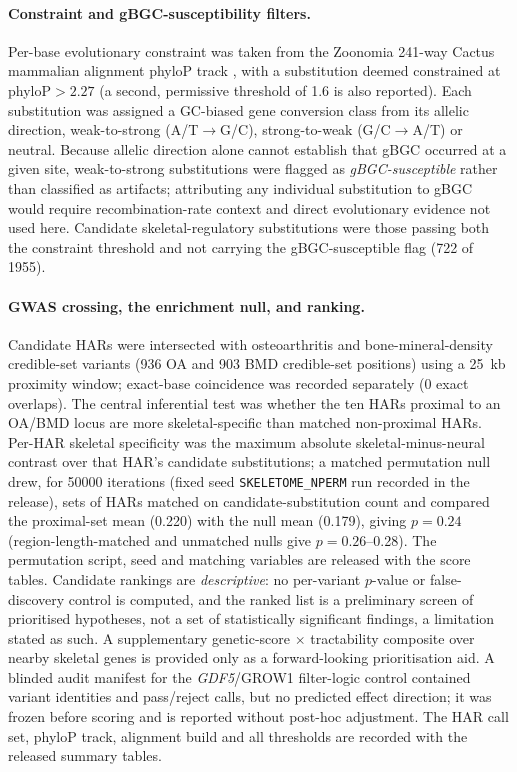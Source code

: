 \documentclass[11pt]{article}
\begin{document}
\paragraph{Constraint and gBGC-susceptibility filters.}
Per-base evolutionary constraint was taken from the Zoonomia \num{241}-way Cactus mammalian alignment
phyloP track \citep{christmas2023zoonomia}, with a substitution deemed constrained at
phyloP${}>\num{2.27}$ (a second, permissive threshold of \num{1.6} is also reported). Each
substitution was assigned a GC-biased gene conversion class \citep{duret2009gbgc} from its allelic
direction, weak-to-strong (A/T${}\rightarrow{}$G/C), strong-to-weak (G/C${}\rightarrow{}$A/T) or
neutral. Because allelic direction alone cannot establish that gBGC occurred at a given site,
weak-to-strong substitutions were flagged as \emph{gBGC-susceptible} rather than classified as
artifacts; attributing any individual substitution to gBGC would require recombination-rate context
and direct evolutionary evidence not used here. Candidate skeletal-regulatory substitutions were
those passing both the constraint threshold and not carrying the gBGC-susceptible flag
(\num{722} of \num{1955}).

\paragraph{GWAS crossing, the enrichment null, and ranking.}
Candidate HARs were intersected with osteoarthritis and bone-mineral-density credible-set variants
(\num{936} OA and \num{903} BMD credible-set positions) using a \num{25}~kb proximity window;
exact-base coincidence was recorded separately (\num{0} exact overlaps). The central inferential
test was whether the ten HARs proximal to an OA/BMD locus are more skeletal-specific than matched
non-proximal HARs. Per-HAR skeletal specificity was the maximum absolute skeletal-minus-neural
contrast over that HAR's candidate substitutions; a matched permutation null drew, for \num{50000}
iterations (fixed seed \texttt{SKELETOME\_NPERM} run recorded in the release), sets of HARs matched
on candidate-substitution count and compared the proximal-set mean (\num{0.220}) with the null mean
(\num{0.179}), giving $p=\num{0.24}$ (region-length-matched and unmatched nulls give
$p=\num{0.26}$--\num{0.28}). The permutation script, seed and matching variables are released with
the score tables. Candidate rankings are \emph{descriptive}: no per-variant $p$-value or
false-discovery control is computed, and the ranked list is a preliminary screen of prioritised
hypotheses, not a set of statistically significant findings, a limitation stated as such. A
supplementary genetic-score $\times$ tractability composite over nearby skeletal genes is provided
only as a forward-looking prioritisation aid. A blinded audit manifest for the
\textit{GDF5}/GROW1 filter-logic control contained variant identities and pass/reject calls,
but no predicted effect direction; it was frozen before scoring and is reported without
post-hoc adjustment. The HAR call set, phyloP track, alignment
build and all thresholds are recorded with the released summary tables.
\end{document}
